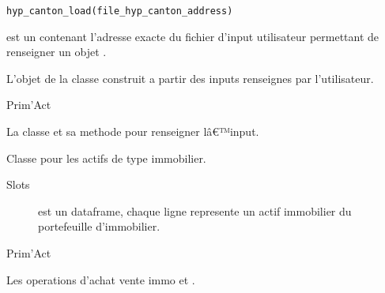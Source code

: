 \documentclass[a4paper]{book}
\begin{document}
%
\begin{Usage}
\begin{verbatim}
hyp_canton_load(file_hyp_canton_address)
\end{verbatim}
\end{Usage}
%
\begin{Arguments}
\begin{ldescription}
\item[\code{file\_hyp\_canton\_address}] est un  contenant l'adresse exacte
du fichier d'input utilisateur
permettant de renseigner un objet .
\end{ldescription}
\end{Arguments}
%
\begin{Value}
L'objet de la classe  construit a partir des inputs renseignes par l'utilisateur.
\end{Value}
%
\begin{Author}\relax
Prim'Act
\end{Author}
%
\begin{SeeAlso}\relax
La classe  et sa methode 
pour renseigner lâ€™input.
\end{SeeAlso}
%
\begin{Description}\relax
Classe pour les actifs de type immobilier.
\end{Description}
%
\begin{Section}{Slots}

\begin{description}

\item[] est un dataframe, chaque ligne represente un actif immobilier du portefeuille d'immobilier.

\end{description}
\end{Section}
%
\begin{Author}\relax
Prim'Act
\end{Author}
%
\begin{SeeAlso}\relax
Les operations d'achat vente immo   et .
\end{SeeAlso}
\end{document}
